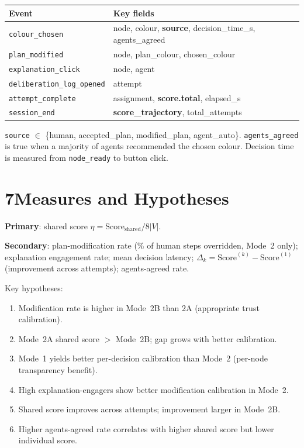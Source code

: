 \documentclass[9pt,twocolumn]{article}
\begin{document}
\begin{center}
\small
\begin{tabular}{ll}
\toprule
\textbf{Event} & \textbf{Key fields} \\
\midrule
\texttt{colour\_chosen}     & node, colour, \textbf{source}, decision\_time\_s, agents\_agreed \\
\texttt{plan\_modified}     & node, plan\_colour, chosen\_colour \\
\texttt{explanation\_click} & node, agent \\
\texttt{deliberation\_log\_opened} & attempt \\
\texttt{attempt\_complete}  & assignment, \textbf{score.total}, elapsed\_s \\
\texttt{session\_end}       & \textbf{score\_trajectory}, total\_attempts \\
\bottomrule
\end{tabular}
\end{center}

\noindent\texttt{source} $\in$ \{human, accepted\_plan, modified\_plan, agent\_auto\}.
\texttt{agents\_agreed} is true when a majority of agents recommended the chosen colour.
Decision time is measured from \texttt{node\_ready} to button click.

\section*{7\quad Measures and Hypotheses}

\textbf{Primary}: shared score $\eta = \mathrm{Score}_\mathrm{shared} / 8|V|$.

\textbf{Secondary}: plan-modification rate (\% of human steps overridden, Mode~2 only);
explanation engagement rate; mean decision latency; $\Delta_k = \mathrm{Score}^{(k)} -
\mathrm{Score}^{(1)}$ (improvement across attempts); agents-agreed rate.

\medskip
\noindent Key hypotheses:
\begin{enumerate}[label=\textbf{H\arabic*.}, leftmargin=2.5em]
  \item Modification rate is higher in Mode~2B than 2A (appropriate trust calibration).
  \item Mode~2A shared score $>$ Mode~2B; gap grows with better calibration.
  \item Mode~1 yields better per-decision calibration than Mode~2 (per-node transparency benefit).
  \item High explanation-engagers show better modification calibration in Mode~2.
  \item Shared score improves across attempts; improvement larger in Mode~2B.
  \item Higher agents-agreed rate correlates with higher shared score but lower individual score.
\end{enumerate}
\end{document}
